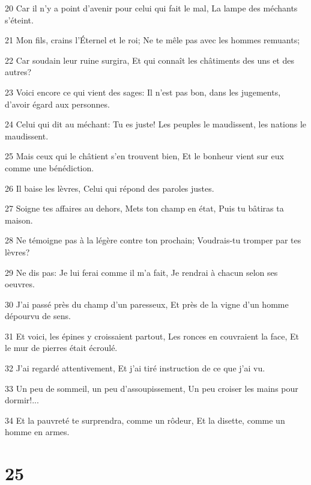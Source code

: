 \par 20 Car il n'y a point d'avenir pour celui qui fait le mal, La lampe des méchants s'éteint.
\par 21 Mon fils, crains l'Éternel et le roi; Ne te mêle pas avec les hommes remuants;
\par 22 Car soudain leur ruine surgira, Et qui connaît les châtiments des uns et des autres?
\par 23 Voici encore ce qui vient des sages: Il n'est pas bon, dans les jugements, d'avoir égard aux personnes.
\par 24 Celui qui dit au méchant: Tu es juste! Les peuples le maudissent, les nations le maudissent.
\par 25 Mais ceux qui le châtient s'en trouvent bien, Et le bonheur vient sur eux comme une bénédiction.
\par 26 Il baise les lèvres, Celui qui répond des paroles justes.
\par 27 Soigne tes affaires au dehors, Mets ton champ en état, Puis tu bâtiras ta maison.
\par 28 Ne témoigne pas à la légère contre ton prochain; Voudrais-tu tromper par tes lèvres?
\par 29 Ne dis pas: Je lui ferai comme il m'a fait, Je rendrai à chacun selon ses oeuvres.
\par 30 J'ai passé près du champ d'un paresseux, Et près de la vigne d'un homme dépourvu de sens.
\par 31 Et voici, les épines y croissaient partout, Les ronces en couvraient la face, Et le mur de pierres était écroulé.
\par 32 J'ai regardé attentivement, Et j'ai tiré instruction de ce que j'ai vu.
\par 33 Un peu de sommeil, un peu d'assoupissement, Un peu croiser les mains pour dormir!...
\par 34 Et la pauvreté te surprendra, comme un rôdeur, Et la disette, comme un homme en armes.

\chapter{25}

